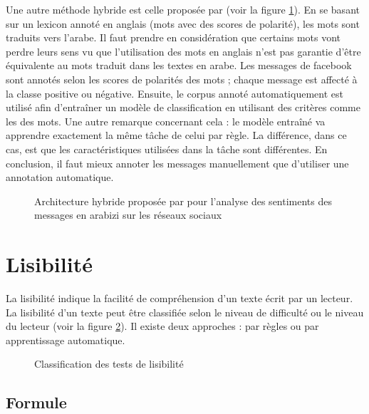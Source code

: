 \documentclass{KodeBook}
\begin{document}
Une autre méthode hybride est celle proposée par \citet{18-guellil-al} (voir la figure \ref{fig:asent-guellil}).
En se basant sur un lexicon annoté en anglais (mots avec des scores de polarité), les mots sont traduits vers l'arabe. 
Il faut prendre en considération que certains mots vont perdre leurs sens vu que l'utilisation des mots en anglais n'est pas garantie d'être équivalente au mots traduit dans les textes en arabe. 
Les messages de facebook sont annotés selon les scores de polarités des mots ; chaque message est affecté à la classe positive ou négative.
Ensuite, le corpus annoté automatiquement est utilisé afin d'entraîner un modèle de classification en utilisant des critères comme les  des mots. 
Une autre remarque concernant cela : le modèle entraîné va apprendre exactement la même tâche de celui par règle.
La différence, dans ce cas, est que les caractéristiques utilisées dans la tâche sont différentes.
En conclusion, il faut mieux annoter les messages manuellement que d'utiliser une annotation automatique.

\begin{figure}
	\centering
	\caption[Architecture hybride pour l'analyse des sentiments en arabizi]{Architecture hybride proposée par \citet{18-guellil-al} pour l'analyse des sentiments des messages en arabizi sur les réseaux sociaux}
	\label{fig:asent-guellil}
\end{figure}

\section{Lisibilité}

La lisibilité indique la facilité de compréhension d'un texte écrit par un lecteur. 
La lisibilité d'un texte peut être classifiée selon le niveau de difficulté ou le niveau du lecteur (voir la figure \ref{fig:lisibilite-classif}). 
Il existe deux approches : par règles ou par apprentissage automatique.

\begin{figure}[!ht]
	\centering
	\caption{Classification des tests de lisibilité}
	\label{fig:lisibilite-classif}
\end{figure}

\subsection{Formule}
\end{document}
